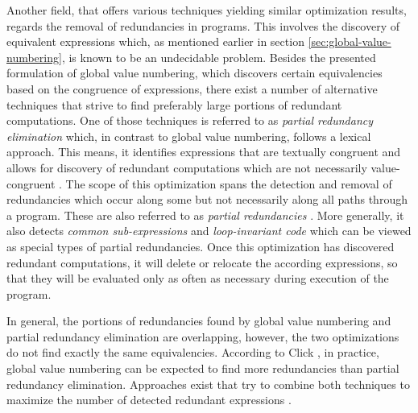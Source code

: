Another field, that offers various techniques yielding similar optimization results, regards the removal of redundancies in programs. This involves the discovery of equivalent expressions which, as mentioned earlier in section \ref{sec:global-value-numbering}, is known to be an undecidable problem. Besides the presented formulation of global value numbering, which discovers certain equivalencies based on the congruence of expressions, there exist a number of alternative techniques that strive to find preferably large portions of redundant computations. One of those techniques is referred to as \emph{partial redundancy elimination} which, in contrast to global value numbering, follows a lexical approach. This means, it identifies expressions that are textually congruent and allows for discovery of redundant computations which are not necessarily value-congruent \cite{click:1995:combininganalyses}.
The scope of this optimization spans the detection and removal of redundancies which occur along some but not necessarily along all paths through a program. These are also referred to as \emph{partial redundancies} \cite{aho:2006:compilersprinciples}.
More generally, it also detects \emph{common sub-expressions} and \emph{loop-invariant code} which can be viewed as special types of partial redundancies. Once this optimization has discovered redundant computations, it will delete or relocate the according expressions, so that they will be evaluated only as often as necessary during execution of the program.

In general, the portions of redundancies found by global value numbering and partial redundancy elimination are overlapping, however, the two optimizations do not find exactly the same equivalencies. According to Click \cite{click:1995:gcm-gvn}, in practice, global value numbering can be expected to find more redundancies than partial redundancy elimination. Approaches exist that try to combine both techniques to maximize the number of detected redundant expressions \cite{vandrunen:2004:pre-gvn}.
